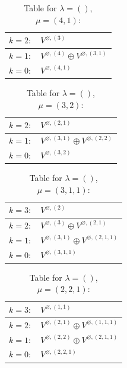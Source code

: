 \documentclass[a4paper,12pt]{article}
\begin{document}
\renewcommand{\arraystretch}{1.6} 
\begin{table}[H]
\centering
\caption{Table for $\lambda = ()$, $\mu = (4, 1)$:}
\begin{tabular}{|>{\centering\arraybackslash}p{15cm}|}
\hline
 $k = 2: \quad V^{\varnothing, (3)} $ \\ \hline
 $k = 1: \quad V^{\varnothing, (4)} \oplus V^{\varnothing, (3, 1)} $ \\ \hline
 $k = 0: \quad V^{\varnothing, (4, 1)} $ \\ \hline
\end{tabular}
\end{table}

\renewcommand{\arraystretch}{1.6} 
\begin{table}[H]
\centering
\caption{Table for $\lambda = ()$, $\mu = (3, 2)$:}
\begin{tabular}{|>{\centering\arraybackslash}p{15cm}|}
\hline
 $k = 2: \quad V^{\varnothing, (2, 1)} $ \\ \hline
 $k = 1: \quad V^{\varnothing, (3, 1)} \oplus V^{\varnothing, (2, 2)} $ \\ \hline
 $k = 0: \quad V^{\varnothing, (3, 2)} $ \\ \hline
\end{tabular}
\end{table}

\renewcommand{\arraystretch}{1.6} 
\begin{table}[H]
\centering
\caption{Table for $\lambda = ()$, $\mu = (3, 1, 1)$:}
\begin{tabular}{|>{\centering\arraybackslash}p{15cm}|}
\hline
 $k = 3: \quad V^{\varnothing, (2)} $ \\ \hline
 $k = 2: \quad V^{\varnothing, (3)} \oplus V^{\varnothing, (2, 1)} $ \\ \hline
 $k = 1: \quad V^{\varnothing, (3, 1)} \oplus V^{\varnothing, (2, 1, 1)} $ \\ \hline
 $k = 0: \quad V^{\varnothing, (3, 1, 1)} $ \\ \hline
\end{tabular}
\end{table}

\renewcommand{\arraystretch}{1.6} 
\begin{table}[H]
\centering
\caption{Table for $\lambda = ()$, $\mu = (2, 2, 1)$:}
\begin{tabular}{|>{\centering\arraybackslash}p{15cm}|}
\hline
 $k = 3: \quad V^{\varnothing, (1, 1)} $ \\ \hline
 $k = 2: \quad V^{\varnothing, (2, 1)} \oplus V^{\varnothing, (1, 1, 1)} $ \\ \hline
 $k = 1: \quad V^{\varnothing, (2, 2)} \oplus V^{\varnothing, (2, 1, 1)} $ \\ \hline
 $k = 0: \quad V^{\varnothing, (2, 2, 1)} $ \\ \hline
\end{tabular}
\end{table}
\end{document}
